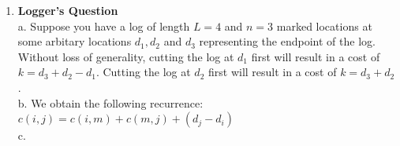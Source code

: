 \documentclass[a4paper,11pt,oneside]{book}
\begin{document}
\begin{enumerate}
  \item {\textbf{Logger's Question}}
  \\ a. Suppose you have a log of length $L=4$ and $n=3$ marked locations at some arbitary locations $d_1, d_2$ and $d_3$ representing the endpoint of the log. Without loss of generality,
  cutting the log at $d_1$ first will result in a cost of $k = d_3 + d_2 - d_1$. Cutting the log at $d_2$ first will result in a cost of $k = d_3 + d_2$. 
  \\ b. We obtain the following recurrence: $c(i, j) = c(i,m) + c(m,j) + (d_j-d_i)$ 
  \\ c.   
\end{enumerate}
\end{document}
